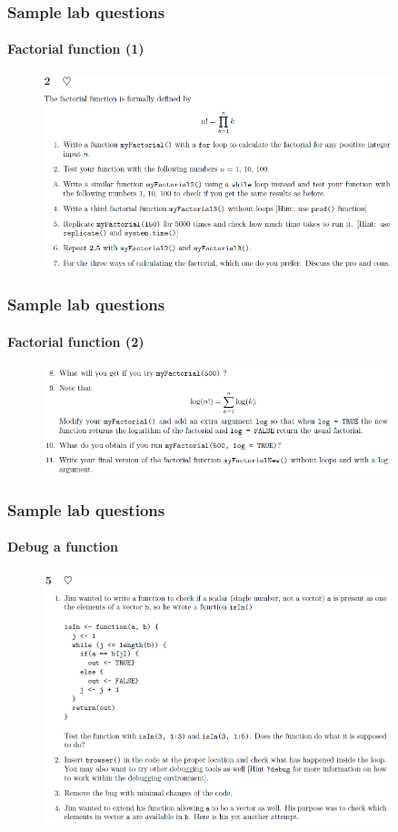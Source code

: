\documentclass[10pt]{beamer}
\begin{document}
\begin{frame}
  \frametitle{Sample lab questions}
  \framesubtitle{Factorial function (1)}
  \begin{figure}
    \centering
    \includegraphics[width=0.9\textwidth]{prod1}
  \end{figure}
\end{frame}


\begin{frame}
  \frametitle{Sample lab questions}
  \framesubtitle{Factorial function (2)}
  \begin{figure}
    \centering
    \includegraphics[width=0.9\textwidth]{prod2}
  \end{figure}
\end{frame}


\begin{frame}
  \frametitle{Sample lab questions}
  \framesubtitle{Debug a function}
  \begin{figure}
    \centering
    \includegraphics[width=0.9\textwidth]{debug}
  \end{figure}
\end{frame}
\end{document}
